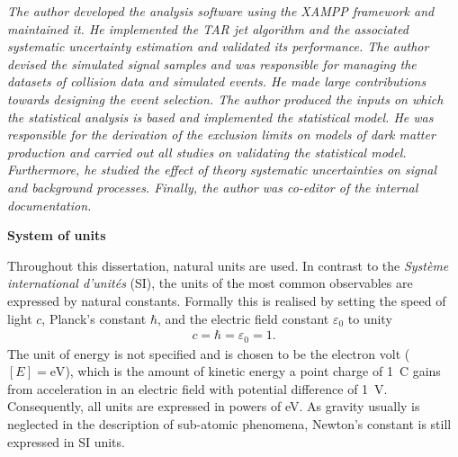 \begin{itemize}
	      \emph{The author developed the analysis software using the \textsc{XAMPP} framework and maintained it. He implemented the TAR jet algorithm and the associated systematic uncertainty estimation and validated its performance. The author devised the simulated signal samples and was responsible for managing the datasets of collision data and simulated events. He made large contributions towards designing the event selection. The author produced the inputs on which the statistical analysis is based and implemented the statistical model. He was responsible for the derivation of the exclusion limits on models of dark matter production and carried out all studies on validating the statistical model. Furthermore, he studied the effect of theory systematic uncertainties on signal and background processes. Finally, the author was co-editor of the internal documentation.}
\end{itemize}


\newpage
\mbox{}
\vfill
\textbf{System of units}

Throughout this dissertation, natural units are used. In contrast to the \emph{Système international d'unités} (SI), the units of the most common observables are expressed by natural constants. Formally this is realised by setting the speed of light \(c\), Planck's constant \(\hbar\), and the electric field constant \(\varepsilon_{0}\) to unity
\begin{align}
    c = \hbar = \varepsilon_{0} = 1.
\end{align}
The unit of energy is not specified and is chosen to be the electron volt (\([E] = \si{\electronvolt}\)), which is the amount of kinetic energy a point charge of \SI{1}{\coulomb} gains from acceleration in an electric field with potential difference of \SI{1}{\volt}. Consequently, all units are expressed in powers of \si{\electronvolt}.
As gravity usually is neglected in the description of sub-atomic phenomena, Newton's constant is still expressed in SI units.
